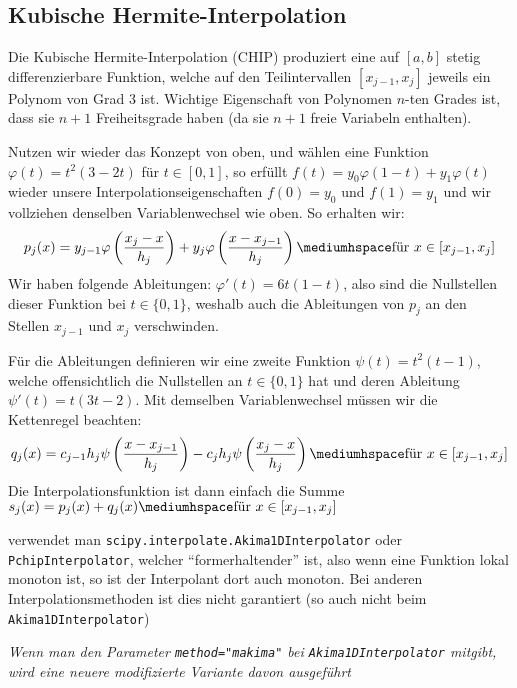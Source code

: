\subsection{Kubische Hermite-Interpolation}
Die Kubische Hermite-Interpolation (CHIP) produziert eine auf $[a, b]$ stetig differenzierbare Funktion, welche auf den Teilintervallen $[x_{j - 1}, x_j]$ jeweils ein Polynom von Grad 3 ist.
Wichtige Eigenschaft von Polynomen $n$-ten Grades ist, dass sie $n + 1$ Freiheitsgrade haben (da sie $n + 1$ freie Variabeln enthalten).

Nutzen wir wieder das Konzept von oben, und wählen eine Funktion $\varphi(t) = t^2(3 - 2t)$ für $t \in [0, 1]$,
so erfüllt $f(t) = y_0\varphi(1 - t) + y_1 \varphi(t)$ wieder unsere Interpolationseigenschaften $f(0) = y_0$ und $f(1) = y_1$ und wir vollziehen denselben Variablenwechsel wie oben.
So erhalten wir:
\begin{align*}
    p_j(x) = y_{j - 1} \varphi \left( \frac{x_j - x}{h_j} \right) + y_j \varphi \left( \frac{x - x_{j - 1}}{h_j} \right) \mediumhspace \text{für } x \in [x_{j - 1}, x_j]
\end{align*}
Wir haben folgende Ableitungen: $\varphi'(t) = 6t(1 - t)$, also sind die Nullstellen dieser Funktion bei $t \in \{ 0, 1 \}$,
weshalb auch die Ableitungen von $p_j$ an den Stellen $x_{j - 1}$ und $x_j$ verschwinden.

Für die Ableitungen definieren wir eine zweite Funktion $\psi(t) = t^2(t - 1)$, welche offensichtlich die Nullstellen an $t \in \{ 0, 1 \}$ hat
und deren Ableitung $\psi'(t) = t(3t - 2)$. Mit demselben Variablenwechsel müssen wir die Kettenregel beachten:
\begin{align*}
    q_j(x) = c_{j - 1} h_j \psi \left( \frac{x - x_{j - 1}}{h_j} \right) - c_j h_j \psi \left( \frac{x_j - x}{h_j} \right) \mediumhspace \text{für } x \in [x_{j - 1}, x_j]
\end{align*}
Die Interpolationsfunktion ist dann einfach die Summe $s_j(x) = p_j(x) + q_j(x) \mediumhspace \text{für } x \in [x_{j - 1}, x_j]$

 verwendet man \texttt{scipy.interpolate.Akima1DInterpolator} oder \texttt{PchipInterpolator}, welcher ``formerhaltender'' ist,
also wenn eine Funktion lokal monoton ist, so ist der Interpolant dort auch monoton.
Bei anderen Interpolationsmethoden ist dies nicht garantiert (so auch nicht beim \texttt{Akima1DInterpolator})

\begin{footnotesize}
    \textit{Wenn man den Parameter \texttt{method="makima"} bei \texttt{Akima1DInterpolator} mitgibt, wird eine neuere modifizierte Variante davon ausgeführt}
\end{footnotesize}

